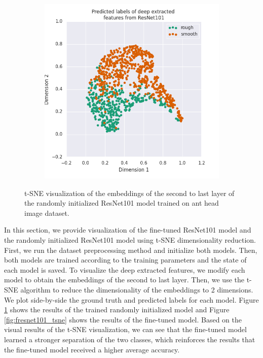 \documentclass{aci}
\numberwithin{equation}{section}
\begin{document}
\begin{figure}[h]
\begin{subfigure}{.45\textwidth}
        \includegraphics[width=1\linewidth]{thesis_assets/plots/resnet101_pred_tsne.png}
    \end{subfigure}
    \caption{t-SNE visualization of the embeddings of the second to last layer
        of the randomly initialized ResNet101 model trained on ant head image
        dataset.}
    \label{fig:resnet101_tsne}
\end{figure}

In this section, we provide visualization of the fine-tuned ResNet101 model and
the randomly initialized ResNet101 model using t-SNE dimensionality reduction.
First, we run the dataset preprocessing method and initialize both models. Then,
both models are trained according to the training parameters and the state of
each model is saved. To visualize the deep extracted features, we modify each
model to obtain the embeddings of the second to last layer. Then, we use the
t-SNE algorithm to reduce the dimensionality of the embeddings to 2 dimensions.
We plot side-by-side the ground truth and predicted labels for each model.
Figure \ref{fig:resnet101_tsne} shows the results of the trained randomly
initialized model and Figure \ref{fig:fresnet101_tsne} shows the results of the
fine-tuned model. Based on the visual results of the t-SNE visualization, we can see that the
fine-tuned model learned a stronger separation of the two classes, which
reinforces the results that the fine-tuned model received a higher average
accuracy.
\end{document}

